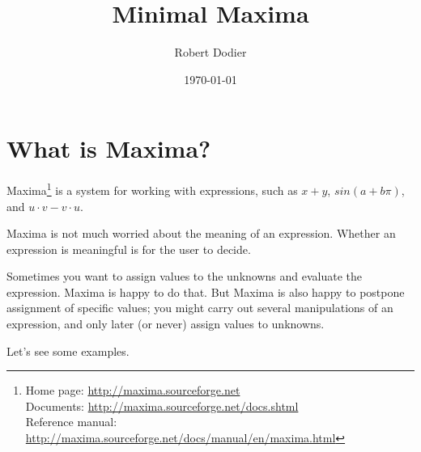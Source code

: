 \documentclass[12pt]{article}
\title{Minimal Maxima}
\author{Robert Dodier}
\date{\today}
\begin{document}
\maketitle

\section{What is Maxima?}

Maxima\footnote
{Home page: \url{http://maxima.sourceforge.net} \\
Documents: \url{http://maxima.sourceforge.net/docs.shtml} \\
Reference manual: \url{http://maxima.sourceforge.net/docs/manual/en/maxima.html}}
is a system for working with expressions,
such as $x + y$, $sin (a + b \pi)$, and $u \cdot v - v \cdot u$.

Maxima is not much worried about the meaning of an expression.
Whether an expression is meaningful is for the user to decide.

Sometimes you want to assign values to the unknowns 
and evaluate the expression.
Maxima is happy to do that.
But Maxima is also happy to postpone assignment of specific values;
you might carry out several manipulations of an expression,
and only later (or never) assign values to unknowns.

Let's see some examples.
\end{document}

